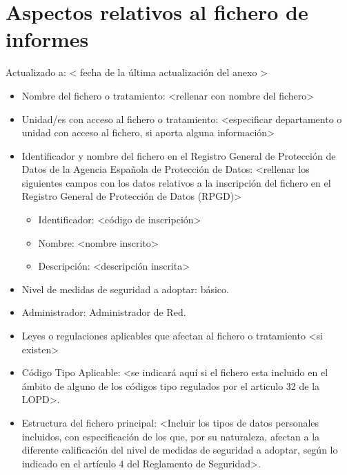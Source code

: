 \documentclass[a4paper,11pt,bibtotoc,noliststotoc]{scrbook}
\begin{document}
\section{Aspectos relativos al fichero de informes}


Actualizado a: < fecha de la última actualización del anexo >

\begin{itemize}
\item Nombre del fichero o tratamiento: <rellenar con nombre del fichero>

\item Unidad/es con acceso al fichero o tratamiento: <especificar departamento o unidad con acceso al fichero, si aporta alguna información>

\item Identificador y nombre del fichero en el Registro General de Protección de Datos de la Agencia Española de Protección de Datos: <rellenar los siguientes campos con los datos relativos a la inscripción del fichero en el Registro General de Protección de Datos (RPGD)>
	\begin{itemize}
	\item Identificador: <código de inscripción>
	\item Nombre: <nombre inscrito>
	\item Descripción: <descripción inscrita>
	\end{itemize}

\item Nivel de medidas de seguridad a adoptar: básico.

\item Administrador: Administrador de Red.

\item Leyes o regulaciones aplicables que afectan al fichero o tratamiento <si existen>

\item Código Tipo Aplicable: <se indicará aquí si el fichero esta incluido en el ámbito de alguno de los códigos tipo regulados por el articulo 32 de la LOPD>.

\item Estructura del fichero principal: <Incluir los tipos de datos personales incluidos, con especificación de los que, por su naturaleza, afectan a la diferente calificación del nivel de medidas de seguridad a adoptar, según lo indicado en el artículo 4 del Reglamento de Seguridad>.


\end{itemize}
\end{document}
